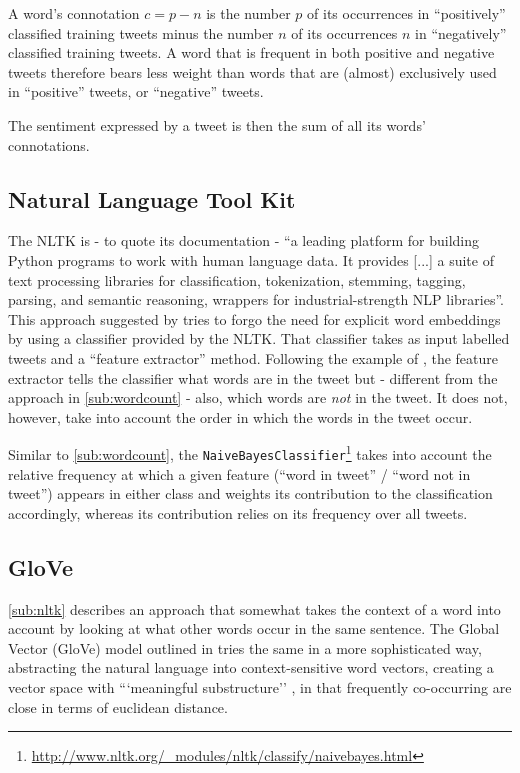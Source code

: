 \documentclass[10pt,conference,compsocconf]{IEEEtran}
\begin{document}
A word's connotation $c = p - n$ is the number $p$ of its occurrences in ``positively'' classified training tweets minus the number $n$ of its occurrences $n$ in ``negatively'' classified training tweets. A word that is frequent in both positive and negative tweets therefore bears less weight than words that are (almost) exclusively used in ``positive'' tweets, or ``negative'' tweets.

The sentiment expressed by a tweet is then the sum of all its words' connotations.

\subsection{Natural Language Tool Kit}\label{sub:nltk}
The NLTK is - to quote its documentation - ``a leading platform for building Python programs to work with human language data. It provides [...] a suite of text processing libraries for classification, tokenization, stemming, tagging, parsing, and semantic reasoning, wrappers for industrial-strength NLP libraries''. This approach suggested by \cite{nltk_blog} tries to forgo the need for explicit word embeddings by using a classifier provided by the NLTK. That classifier takes as input labelled tweets and a ``feature extractor'' method. Following the example of \cite{nltk_blog}, the feature extractor tells the classifier what words are in the tweet but - different from the approach in \autoref{sub:wordcount} - also, which words are \textit{not} in the tweet. It does not, however, take into account the order in which the words in the tweet occur.

Similar to \autoref{sub:wordcount}, the \texttt{NaiveBayesClassifier}\footnote{\url{http://www.nltk.org/_modules/nltk/classify/naivebayes.html}} takes into account the relative frequency at which a given feature (``word in tweet'' / ``word not in tweet'') appears in either class and weights its contribution to the classification accordingly, whereas its contribution relies on its frequency over all tweets.
\subsection{GloVe}\label{sub:glove}
\autoref{sub:nltk} describes an approach that somewhat takes the context of a word into account by looking at what other words occur in the same sentence. The Global Vector (GloVe) model outlined in \cite{glove_paper} tries the same in a more sophisticated way, abstracting the natural language into context-sensitive word vectors, creating a vector space with ```meaningful substructure'' \cite{glove_paper}, in that frequently co-occurring are close in terms of euclidean distance.
\end{document}

